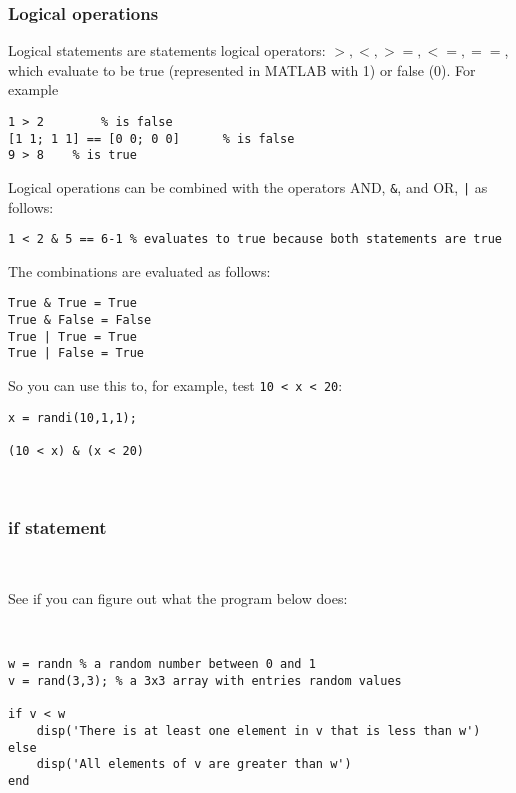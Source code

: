 \documentclass[11pt]{amsart}
\begin{document}
\subsubsection{Logical operations}

Logical statements are statements logical operators: $>, <, >=, <=, ==$, which evaluate to be true (represented in MATLAB with 1) or false (0). For example

\color{blue}
\begin{verbatim}
1 > 2        % is false
[1 1; 1 1] == [0 0; 0 0]      % is false
9 > 8    % is true
\end{verbatim}
\color{black}

Logical operations can be combined with the operators AND, \verb+&+, and OR, \verb+|+ as follows:

\color{blue}
\begin{verbatim}
1 < 2 & 5 == 6-1 % evaluates to true because both statements are true
\end{verbatim}
\color{black}

The combinations are evaluated as follows:

\color{blue}
\begin{verbatim}
True & True = True
True & False = False
True | True = True
True | False = True
\end{verbatim}
\color{black}

So you can use this to, for example, test \verb+10 < x < 20+:

\color{blue}
\begin{verbatim}
x = randi(10,1,1);

(10 < x) & (x < 20)
\end{verbatim}
\color{black}

\

\subsubsection{if statement}

\

See if you can figure out what the program below does:

\

\color{blue}
\begin{verbatim}
w = randn % a random number between 0 and 1
v = rand(3,3); % a 3x3 array with entries random values

if v < w
    disp('There is at least one element in v that is less than w')
else
    disp('All elements of v are greater than w')
end
\end{verbatim}
\color{black}
\end{document}
